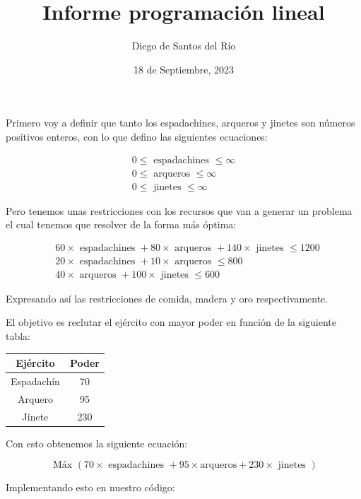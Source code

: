 \documentclass[10pt]{article}
\title{Informe programación lineal }
\author{Diego de Santos del Río}
\date{18 de Septiembre, 2023}
\begin{document}
\maketitle
Primero voy a definir que tanto los espadachines, arqueros y jinetes son números positivos enteros, con lo que defino las siguientes ecuaciones:

$$
\begin{gathered}
0 \leq \text { espadachines } \leq \infty \\
0 \leq \text { arqueros } \leq \infty \\
0 \leq \text { jinetes } \leq \infty
\end{gathered}
$$

Pero tenemos unas restricciones con los recursos que van a generar un problema el cual tenemos que resolver de la forma más óptima:

$$
\begin{aligned}
& 60 \times \text { espadachines }+80 \times \text { arqueros }+140 \times \text { jinetes } \leq 1200 \\
& 20 \times \text { espadachines }+10 \times \text { arqueros } \leq 800 \\
& 40 \times \text { arqueros }+100 \times \text { jinetes } \leq 600
\end{aligned}
$$

Expresando así las restricciones de comida, madera y oro respectivamente.

El objetivo es reclutar el ejército con mayor poder en función de la siguiente tabla:

\begin{center}
\begin{tabular}{|c|c|}
\hline
Ejército & Poder \\
\hline
Espadachín & 70 \\
\hline
Arquero & 95 \\
\hline
Jinete & 230 \\
\hline
\end{tabular}
\end{center}

Con esto obtenemos la siguiente ecuación:

$$
\text { Máx }(70 \times \text { espadachines }+95 \times \text {arqueros}+230 \times \text { jinetes })
$$

Implementando esto en nuestro código:
\end{document}
